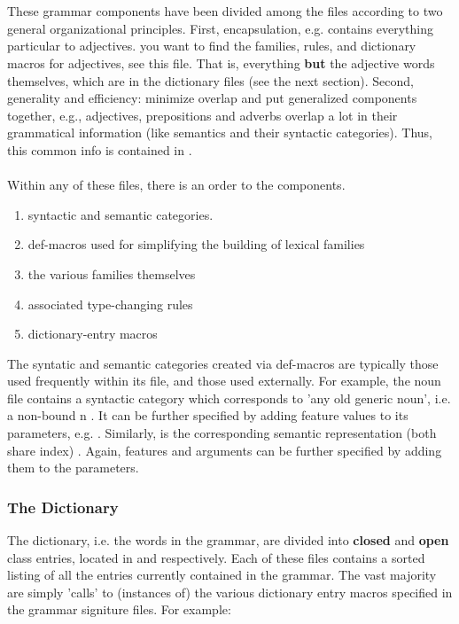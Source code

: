 

          \\ \\
These grammar components have been divided among the files according to two general organizational principles. First, encapsulation, e.g.  contains everything particular to adjectives. you want to find the families, rules, and dictionary macros for adjectives, see this file. That is, everything \textbf{but} the adjective words themselves, which are in the dictionary files (see the next section). Second, generality and efficiency: minimize overlap and put generalized components together, e.g., adjectives, prepositions and adverbs overlap a lot in their grammatical information (like semantics and their syntactic categories). Thus, this common info is contained in . \\ \\
Within any of these files, there is an order to the components. 
\begin{enumerate}		
\item  syntactic and semantic categories. 
\item  def-macros used for simplifying the building of lexical families
\item  the various families themselves
\item  associated type-changing rules
\item  dictionary-entry macros
\end{enumerate}
The syntatic and semantic categories created via def-macros are typically those used frequently within
its file, and those used externally. For example, the noun file contains a syntactic category  which corresponds to 'any old generic noun', i.e. a non-bound n . It can be further specified by
adding feature values to its parameters, e.g. . Similarly,  is the corresponding semantic representation (both share index) . Again, features and arguments can be further specified by adding them to the parameters.
   			 		 
\subsubsection{The Dictionary}

   The dictionary, i.e. the words in the grammar, are divided into \textbf{closed} and \textbf{open} class entries, located in  and  respectively. Each of these files  contains a sorted listing of all the entries currently contained in the grammar. The vast majority are simply 'calls' to (instances of) the various dictionary entry macros specified in the grammar signiture files. For example: 
   
